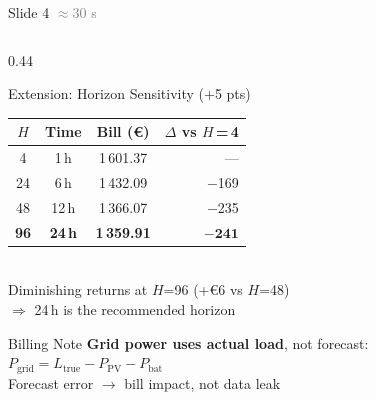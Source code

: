 \documentclass[aspectratio=169, 10pt]{beamer}
\begin{document}
\begin{frame}{Slide 4 \hfill \textcolor{gray}{\small$\approx$30 s}}
\begin{columns}[T]
    \begin{column}{0.44\textwidth}
      \begin{block}{Extension: Horizon Sensitivity (+5 pts)}
        \renewcommand{\arraystretch}{1.2}
        \small
        \begin{tabular}{cccr}
          \toprule
          $H$ & Time & Bill (\euro) & $\Delta$ vs $H$\,=\,4 \\
          \midrule
          4   & 1\,h   & 1\,601.37 & --- \\
          24  & 6\,h   & 1\,432.09 & $-$169 \\
          48  & 12\,h  & 1\,366.07 & $-$235 \\
          \rowcolor{solaryellow!30}
          \textbf{96} & \textbf{24\,h} & \textbf{1\,359.91} & $\mathbf{-241}$ \\
          \bottomrule
        \end{tabular}\\[4pt]
        \footnotesize
        Diminishing returns at $H$=96 (+\euro6 vs $H$=48)\\
        $\Rightarrow$ 24\,h is the recommended horizon
      \end{block}

      \vspace{4pt}
      \begin{exampleblock}{Billing Note}
        \small
        \textbf{Grid power uses actual load}, not forecast:\\
        $P_{\text{grid}} = L_{\text{true}} - P_{\text{PV}} - P_{\text{bat}}$\\
        Forecast error $\rightarrow$ bill impact, not data leak
      \end{exampleblock}
    \end{column}
  \end{columns}
\end{frame}
\end{document}
